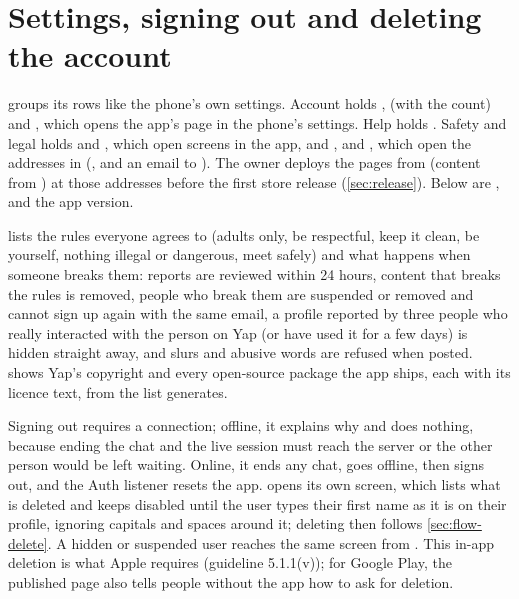 \section{Settings, signing out and deleting the account}

 groups its rows like the phone's own settings. \textsf{Account} holds ,
 (with the count) and , which opens the app's page in the
phone's settings. \textsf{Help} holds . \textsf{Safety and legal} holds
 and , which open screens in the app, and ,  and , which open the addresses in
 (,  and an email to
). The owner deploys the pages from  (content from ) at those addresses
before the first store release (\cref{sec:release}). Below are ,  and
the app version.

 lists the rules everyone agrees to (adults only, be respectful, keep it clean, be
yourself, nothing illegal or dangerous, meet safely) and what happens when someone breaks them: reports
are reviewed within 24 hours, content that breaks the rules is removed, people who break them are
suspended or removed and cannot sign up again with the same email, a profile reported by three people who
really interacted with the person on Yap (or have used it for a few days) is hidden straight away, and slurs and abusive
words are refused when posted.  shows Yap's copyright and every open-source package
the app ships, each with its licence text, from the list  generates.

Signing out requires a connection; offline, it explains why and does nothing, because ending the chat and
the live session must reach the server or the other person would be left waiting. Online, it ends any chat,
goes offline, then signs out, and the Auth listener resets the app.  opens its own
screen, which lists what is deleted and keeps  disabled until the user types their
first name as it is on their profile, ignoring capitals and spaces around it; deleting then follows
\cref{sec:flow-delete}. A hidden or suspended user reaches the same screen from . This in-app deletion is what Apple requires (guideline 5.1.1(v)); for Google Play,
the published  page also tells people without the app how to ask for deletion.

